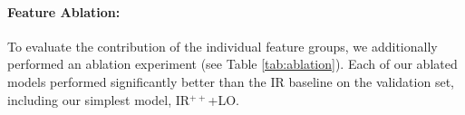 \vspace{-2mm}

\paragraph{Feature Ablation:} To evaluate the contribution of the individual feature groups, we additionally performed an ablation experiment (see Table \ref{tab:ablation}).
Each of our ablated models performed significantly better than the IR baseline on the validation set, including our simplest model, IR$^{++}$+LO.
   


